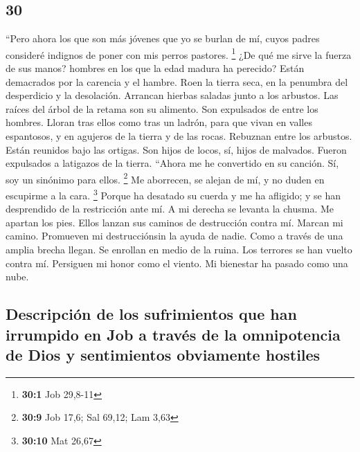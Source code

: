 \begin{paracol}{2}
\hypertarget{section-58}{%
\section{30}\label{section-58}}

 ``Pero ahora los que son más jóvenes que yo se burlan de
mí, cuyos padres consideré indignos de poner con mis perros pastores.
\footnote{\textbf{30:1} Job 29,8-11}  ¿De qué me sirve la
fuerza de sus manos? hombres en los que la edad madura ha perecido?
 Están demacrados por la carencia y el hambre. Roen la
tierra seca, en la penumbra del desperdicio y la desolación.
 Arrancan hierbas saladas junto a los arbustos. Las raíces
del árbol de la retama son su alimento.  Son expulsados de
entre los hombres. Lloran tras ellos como tras un ladrón, 
para que vivan en valles espantosos, y en agujeros de la tierra y de las
rocas.  Rebuznan entre los arbustos. Están reunidos bajo
las ortigas.  Son hijos de locos, sí, hijos de malvados.
Fueron expulsados a latigazos de la tierra.  ``Ahora me he
convertido en su canción. Sí, soy un sinónimo para ellos. \footnote{\textbf{30:9}
  Job 17,6; Sal 69,12; Lam 3,63}  Me aborrecen, se alejan
de mí, y no duden en escupirme a la cara. \footnote{\textbf{30:10} Mat
  26,67}  Porque ha desatado su cuerda y me ha afligido;
y se han desprendido de la restricción ante mí.  A mi
derecha se levanta la chusma. Me apartan los pies. Ellos lanzan sus
caminos de destrucción contra mí.  Marcan mi camino.
Promueven mi destrucciónsin la ayuda de nadie.  Como a
través de una amplia brecha llegan. Se enrollan en medio de la ruina.
 Los terrores se han vuelto contra mí. Persiguen mi honor
como el viento. Mi bienestar ha pasado como una nube.

\hypertarget{descripciuxf3n-de-los-sufrimientos-que-han-irrumpido-en-job-a-travuxe9s-de-la-omnipotencia-de-dios-y-sentimientos-obviamente-hostiles}{%
\subsection{Descripción de los sufrimientos que han irrumpido en Job a
través de la omnipotencia de Dios y sentimientos obviamente
hostiles}\label{descripciuxf3n-de-los-sufrimientos-que-han-irrumpido-en-job-a-travuxe9s-de-la-omnipotencia-de-dios-y-sentimientos-obviamente-hostiles}}


\end{paracol}
